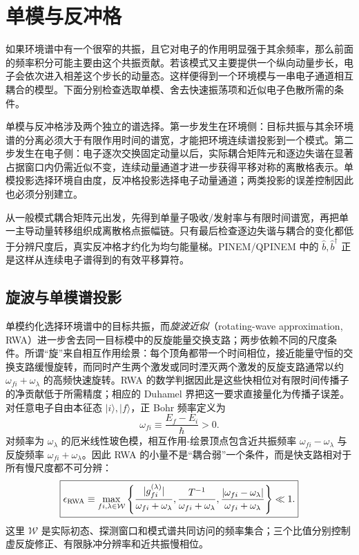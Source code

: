 \section{单模与反冲格}

如果环境谱中有一个很窄的共振，且它对电子的作用明显强于其余频率，那么前面的频率积分可能主要由这个共振贡献。若该模式又主要提供一个纵向动量步长，电子会依次进入相差这个步长的动量态。这样便得到一个环境模与一串电子通道相互耦合的模型。下面分别检查选取单模、舍去快速振荡项和近似电子色散所需的条件。

单模与反冲格涉及两个独立的谱选择。第一步发生在环境侧：目标共振与其余环境谱的分离必须大于有限作用时间的谱宽，才能把环境连续谱投影到一个模式。第二步发生在电子侧：电子逐次交换固定动量以后，实际耦合矩阵元和逐边失谐在显著占据窗口内仍需近似不变，连续动量通道才进一步获得平移对称的离散格表示。单模投影选择环境自由度，反冲格投影选择电子动量通道；两类投影的误差控制因此也必须分别建立。

从一般模式耦合矩阵元出发，先得到单量子吸收/发射率与有限时间谱宽，再把单一主导动量转移组织成离散格点振幅链。只有最后检查逐边失谐与耦合的变化都低于分辨尺度后，真实反冲格才约化为均匀能量梯。PINEM/QPINEM 中的 \(\hat b,\hat b^\dagger\) 正是这样从连续电子谱得到的有效平移算符。

\subsection{旋波与单模谱投影}

单模约化选择环境谱中的目标共振，而\emph{旋波近似}（rotating-wave approximation, RWA）进一步舍去同一目标模中的反旋能量交换支路；两步依赖不同的尺度条件。所谓“旋”来自相互作用绘景：每个顶角都带一个时间相位，接近能量守恒的交换支路缓慢旋转，而同时产生两个激发或同时湮灭两个激发的反旋支路通常以约 $\omega_{fi}+\omega_\lambda$ 的高频快速旋转。RWA 的数学判据因此是这些快相位对有限时间传播子的净贡献低于所需精度；相应的 Duhamel 界把这一要求直接量化为传播子误差。对任意电子自由本征态 $|i\rangle,|f\rangle$，正 Bohr 频率定义为
\begin{equation*}
\omega_{fi}\equiv\frac{E_f-E_i}{\hbar}>0.
\end{equation*}
对频率为 $\omega_\lambda$ 的厄米线性玻色模，相互作用-绘景顶点包含近共振频率 $\omega_{fi}-\omega_\lambda$ 与反旋频率 $\omega_{fi}+\omega_\lambda$。因此 RWA 的小量不是“耦合弱”一个条件，而是快支路相对于所有慢尺度都不可分辨：
\begin{equation}
\boxed{
\epsilon_{\rm RWA}
\equiv
\max_{fi,\lambda\in\mathcal W}
\left\{
\frac{|g_{fi}^{(\lambda)}|}{\omega_{fi}+\omega_\lambda},
\frac{T^{-1}}{\omega_{fi}+\omega_\lambda},
\frac{|\omega_{fi}-\omega_\lambda|}{\omega_{fi}+\omega_\lambda}
\right\}\ll1 .}
\label{eq:general_rwa_control_parameter}
\end{equation}
这里 $\mathcal W$ 是实际初态、探测窗口和模式谱共同访问的频率集合；三个比值分别控制虚反旋修正、有限脉冲分辨率和近共振慢相位。

